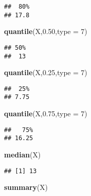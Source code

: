 \documentclass[
]{article}
\newenvironment{Shaded}{\begin{snugshade}}{\end{snugshade}}
\newcommand{\AttributeTok}[1]{\textcolor[rgb]{0.13,0.29,0.53}{#1}}
\newcommand{\DecValTok}[1]{\textcolor[rgb]{0.00,0.00,0.81}{#1}}
\newcommand{\FloatTok}[1]{\textcolor[rgb]{0.00,0.00,0.81}{#1}}
\newcommand{\FunctionTok}[1]{\textcolor[rgb]{0.13,0.29,0.53}{\textbf{#1}}}
\newcommand{\NormalTok}[1]{#1}
\begin{document}
\begin{verbatim}
##  80% 
## 17.8
\end{verbatim}

\begin{Shaded}
\begin{Highlighting}[]
\FunctionTok{quantile}\NormalTok{(X,}\FloatTok{0.50}\NormalTok{,}\AttributeTok{type =} \DecValTok{7}\NormalTok{)}
\end{Highlighting}
\end{Shaded}

\begin{verbatim}
## 50% 
##  13
\end{verbatim}

\begin{Shaded}
\begin{Highlighting}[]
\FunctionTok{quantile}\NormalTok{(X,}\FloatTok{0.25}\NormalTok{,}\AttributeTok{type =} \DecValTok{7}\NormalTok{)}
\end{Highlighting}
\end{Shaded}

\begin{verbatim}
##  25% 
## 7.75
\end{verbatim}

\begin{Shaded}
\begin{Highlighting}[]
\FunctionTok{quantile}\NormalTok{(X,}\FloatTok{0.75}\NormalTok{,}\AttributeTok{type =} \DecValTok{7}\NormalTok{)}
\end{Highlighting}
\end{Shaded}

\begin{verbatim}
##   75% 
## 16.25
\end{verbatim}

\begin{Shaded}
\begin{Highlighting}[]
\FunctionTok{median}\NormalTok{(X)}
\end{Highlighting}
\end{Shaded}

\begin{verbatim}
## [1] 13
\end{verbatim}

\begin{Shaded}
\begin{Highlighting}[]
\FunctionTok{summary}\NormalTok{(X)}
\end{Highlighting}
\end{Shaded}
\end{document}
